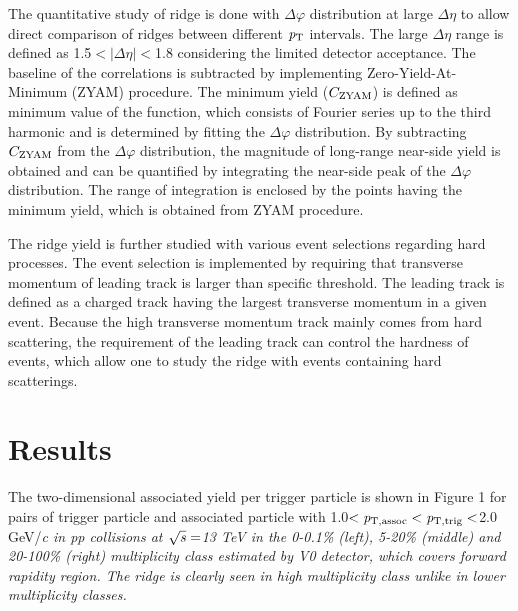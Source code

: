 \documentclass[ALICE,manyauthors]{cernphprep}
\begin{document}
The quantitative study of ridge is done with $\Delta\varphi$ distribution at large $\Delta\eta$ to allow direct comparison of ridges between different $\it{p}_{\rm{T}}$ intervals. The large $\Delta\eta$ range is defined as 1.5$<|\Delta\eta|<$1.8 considering the limited detector acceptance. The baseline of the correlations is subtracted by implementing Zero-Yield-At-Minimum (ZYAM) procedure. The minimum yield ($C_{\rm{ZYAM}}$) is defined as minimum value of the function, which consists of Fourier series up to the third harmonic and is determined by fitting the $\Delta\varphi$ distribution. By subtracting $C_{\rm{ZYAM}}$ from the $\Delta\varphi$ distribution, the magnitude of long-range near-side yield is obtained and can be quantified by integrating the near-side peak of the $\Delta\varphi$ distribution. The range of integration is enclosed by the points having the minimum yield, which is obtained from ZYAM procedure.

The ridge yield is further studied with various event selections regarding hard processes. The event selection is implemented by requiring that transverse momentum of leading track is larger than specific threshold. The leading track is defined as a charged track having the largest transverse momentum in a given event. Because the high transverse momentum track mainly comes from hard scattering, the requirement of the leading track can control the hardness of events, which allow one to study the ridge with events containing hard scatterings.

\section {Results}

The two-dimensional associated yield per trigger particle is shown in Figure 1 for pairs of trigger particle and associated particle with 1.0$<\it{p}_{\rm{T, assoc}}<\it{p}_{\rm{T, trig}}<$2.0 GeV/\it{c}\rm{} in pp collisions at $\sqrt{\it{s}} = $\unit{13} {\rm{}TeV} in the 0-0.1\% (left), 5-20\% (middle) and 20-100\% (right) multiplicity class estimated by V0 detector, which covers forward rapidity region. The ridge is clearly seen in high multiplicity class unlike in lower multiplicity classes.
\end{document}
